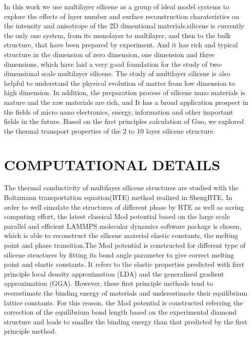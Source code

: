 \documentclass[%
 reprint,
 amsmath,amssymb,
 aps,
 prb,
]{revtex4-1}
\begin{document}
In this work we use multilayer silicene as a group of  ideal model systems to explore the effects of layer number and  surface reconstruction charateristics on the intensity and anisotrope of the 2D dimentional materials.silicene  is currently the only one system, from its monolayer to multilayer, and then to the bulk structure, that have been prepared by experiment. And it has rich and typical structure in the dimension of zero dimension, one dimension and three dimensions, which have laid a very good foundation for the study of two-dimensional scale multilayer silicene. The study of multilayer silicene is also helpful to understand the physical evolution of matter from low dimension to high dimension. In addition, the preparation process of silicene nano materials is mature and the raw materials are rich, and It has a broad application prospect in the fields of micro nano electronics, energy, information and other important fields in the future. Based on the first principles calculation of Guo\cite{Guo2015Structural}, we explored the thermal transport properties of the 2 to 10 layer silicene structure.


\section{COMPUTATIONAL DETAILS}

The thermal conductivity of multilayer silicene structures are studied with the Boltzmann transportation equation(BTE) method realized in ShengBTE\cite{Li2014}. In order to well simulate the structures of different phase by BTE as well as saving computing effort, the latest classical Mod potential\cite{Parks2007} based on the large scale parallel and efficient LAMMPS molecular dynamics software package is chosen\cite{Kumagai2007Development}, which is able to reconstruct the silicene material elastic constants, the melting point and phase transition.The Mod potential is constructed for different type of silicene structures by fitting its bond angle parameter to give correct melting point and elastic constants. It refers to the elastic properties predicted with first principle local density approximation (LDA) and the generalized gradient approximation (GGA). However, these first principle methods tend to overestimate the binding energy of materials and underestimate their equilibrium lattice constants. For this reason, the Mod potential is constructed referring the correction of the equilibrium bond length based on the experimental diamond structure and leads to smaller the binding energy than that predicted by the first principle method.
\end{document}
